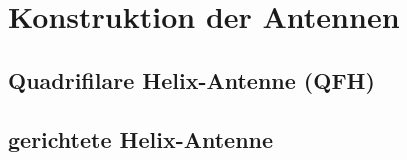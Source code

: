 \chapter{Konstruktion der Antennen}
\label{chap:cons}

\section{Quadrifilare Helix-Antenne (QFH)}
\label{cons-qfh}

\section{gerichtete Helix-Antenne}
\label{cons-helix}